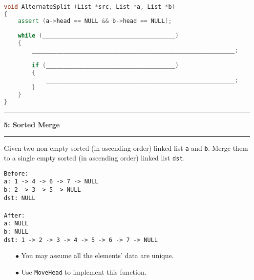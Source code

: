 \documentclass[10.5pt]{article}
\newcommand\question[2]{\vspace{.25in}\hrule\textbf{#1: #2}\vspace{.5em}\hrule\vspace{.10in}}
\begin{document}
\hrulefill
\begin{lstlisting}[language=C++]

void AlternateSplit (List *src, List *a, List *b)
{
    assert (a->head == NULL && b->head == NULL);
    
    while (______________________________________)
    {
        __________________________________________________________;

     	if (_____________________________________)
     	{
     	    ______________________________________________________;
     	}
    }
}

\end{lstlisting}
\pagebreak


\question{5}{Sorted Merge}
Given two non-empty sorted (in ascending order) linked list \texttt{a} and \texttt{b}. Merge them to a single empty sorted (in ascending order) linked list \texttt{dst}.

\texttt{Before:}\\
\texttt{a: 1 -> 4 -> 6 -> 7 -> NULL}\\
\texttt{b: 2 -> 3 -> 5 -> NULL}\\
\texttt{dst: NULL}\\
\\
\texttt{After:}\\
\texttt{a: NULL}\\
\texttt{b: NULL}\\
\texttt{dst: 1 -> 2 -> 3 -> 4 -> 5 -> 6 -> 7 -> NULL}\\

\begin{enumerate}
	\item[$\bullet$] You may assume all the elements' data are unique.
	\item[$\bullet$] Use \texttt{MoveHead} to implement this function.
\end{enumerate}
\newpage
\end{document}
